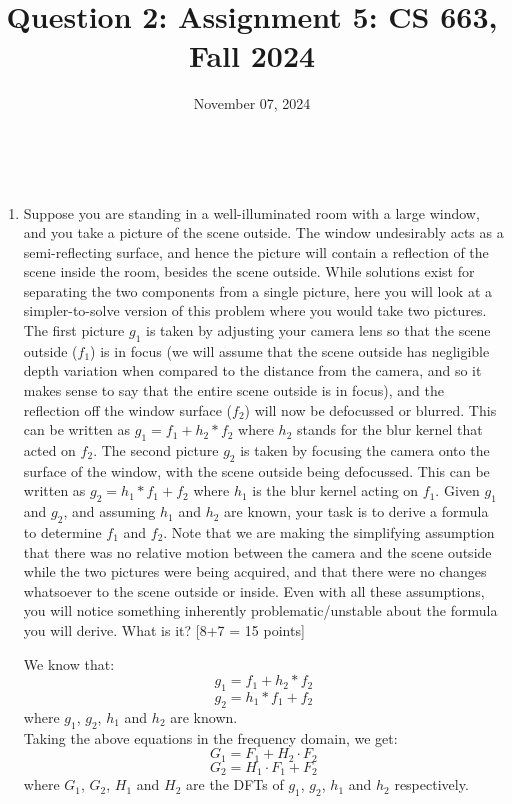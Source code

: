 \documentclass{article}
\title{Question 2: Assignment 5: CS 663, Fall 2024}
\author{
\IEEEauthorblockN{
    \begin{tabular}{cccc}
        \begin{minipage}[t]{0.23\textwidth}
            \centering
            Amitesh Shekhar\\
            IIT Bombay\\
            22b0014@iitb.ac.in
        \end{minipage} & 
        \begin{minipage}[t]{0.23\textwidth}
            \centering
            Anupam Rawat\\
            IIT Bombay\\
            22b3982@iitb.ac.in
        \end{minipage} & 
        \begin{minipage}[t]{0.23\textwidth}
            \centering
            Toshan Achintya Golla\\
            IIT Bombay\\
            22b2234@iitb.ac.in
        \end{minipage} \\
        \\ 
    \end{tabular}
}
}
\date{November 07, 2024}
\begin{document}
\maketitle

\\

\begin{enumerate}
    \item Suppose you are standing in a well-illuminated room with a large window, 
    and you take a picture of the scene outside. The window undesirably acts as a semi-reflecting surface, 
    and hence the picture will contain a reflection of the scene inside the room, besides the scene outside. 
    While solutions exist for separating the two components from a single picture, 
    here you will look at a simpler-to-solve version of this problem where you would take two pictures. 
    The first picture $g_1$ is taken by adjusting your camera lens so that the scene outside ($f_1$) is in focus 
    (we will assume that the scene outside has negligible depth variation when compared to the distance from the camera, 
    and so it makes sense to say that the entire scene outside is in focus), and the reflection off the window surface ($f_2$) 
    will now be defocussed or blurred.  This can be written as $g_1 = f_1 + h_2 * f_2$ where $h_2$ stands for the 
    blur kernel that acted on $f_2$. The second picture $g_2$ is taken by focusing the camera onto the surface of the window, 
    with the scene outside being defocussed. This can be written as $g_2 = h_1 * f_1 + f_2$ where $h_1$ is the 
    blur kernel acting on $f_1$. Given $g_1$ and $g_2$, and assuming $h_1$ and $h_2$ are known, your task is to derive 
    a formula to determine $f_1$ and $f_2$. Note that we are making the simplifying assumption that there was no relative 
    motion between the camera and the scene outside while the two pictures were being acquired, and that there were 
    no changes whatsoever to the scene outside or inside. Even with all these assumptions, you will notice something 
    inherently problematic/unstable about the formula you will derive. What is it? \textsf{[8+7 = 15 points]}

\newline
    We know that:
    \[
        g_1 = f_1 + h_2 * f_2
    \]
    \[
        g_2 = h_1 * f_1 + f_2
    \]
    where $g_1$, $g_2$, $h_1$ and $h_2$ are known. \\
    Taking the above equations in the frequency domain, we get:
    \[
        G_1 = F_1 + H_2 \cdot F_2
    \]
    \[
        G_2 = H_1 \cdot F_1 + F_2
    \]
    where $G_1$, $G_2$, $H_1$ and $H_2$ are the DFTs of $g_1$, $g_2$, $h_1$ and $h_2$ respectively. \\


\end{enumerate}
\end{document}
